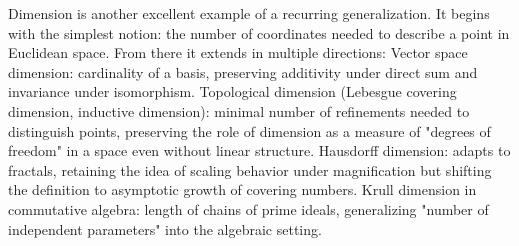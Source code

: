 \begin{commentary}[Generalizations]
Dimension is another excellent example of a recurring generalization. It begins with the simplest notion: the number of coordinates needed to describe a point in Euclidean space. From there it extends in multiple directions: Vector space dimension: cardinality of a basis, preserving additivity under direct sum and invariance under isomorphism. Topological dimension (Lebesgue covering dimension, inductive dimension): minimal number of refinements needed to distinguish points, preserving the role of dimension as a measure of "degrees of freedom" in a space even without linear structure. Hausdorff dimension: adapts to fractals, retaining the idea of scaling behavior under magnification but shifting the definition to asymptotic growth of covering numbers. Krull dimension in commutative algebra: length of chains of prime ideals, generalizing "number of independent parameters" into the algebraic setting.

\end{commentary}

\vspace{1em}

